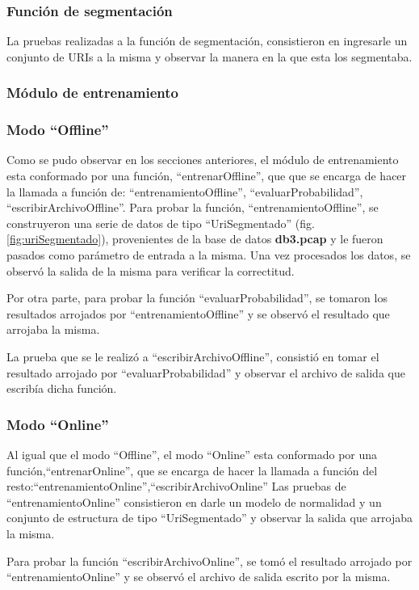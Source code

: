 \subsubsection*{Función de segmentación}

La pruebas realizadas a la función de segmentación, consistieron en ingresarle un conjunto de URIs a la misma y observar la manera en la que
esta los segmentaba.

\subsubsection{Módulo de entrenamiento}
\subsubsection*{Modo ``Offline''}
Como se pudo observar en los secciones anteriores, el módulo de entrenamiento esta conformado por una función, ``entrenarOffline'', que que se
encarga de hacer la llamada a función de: ``entrenamientoOffline'', ``evaluarProbabilidad'', ``escribirArchivoOffline''.
Para probar la función, ``entrenamientoOffline'', se construyeron una serie de datos de tipo ``UriSegmentado'' (fig. \ref{fig:uriSegmentado}), provenientes de la base de datos \textbf{db3.pcap} y le fueron pasados como parámetro de entrada a la misma. Una vez procesados los datos, se observó la salida de la misma para verificar la correctitud.

Por otra parte, para probar la función ``evaluarProbabilidad'', se tomaron los resultados arrojados por ``entrenamientoOffline'' y se
observó el resultado que arrojaba la misma. 

La prueba que se le realizó a ``escribirArchivoOffline'', consistió en tomar el resultado arrojado por ``evaluarProbabilidad'' y observar el
archivo de salida que escribía dicha función. 

\subsubsection*{Modo ``Online''}
Al igual que el modo ``Offline'', el modo ``Online'' esta conformado por
una función,``entrenarOnline'', que se encarga de hacer la llamada a función
del resto:``entrenamientoOnline'',``escribirArchivoOnline''
Las pruebas de ``entrenamientoOnline'' consistieron en darle un modelo de normalidad y un conjunto de estructura
de tipo ``UriSegmentado'' y observar la salida que arrojaba la misma.

Para probar la función ``escribirArchivoOnline'', se tomó el resultado arrojado por ``entrenamientoOnline'' y se observó el archivo de salida escrito por la misma.
